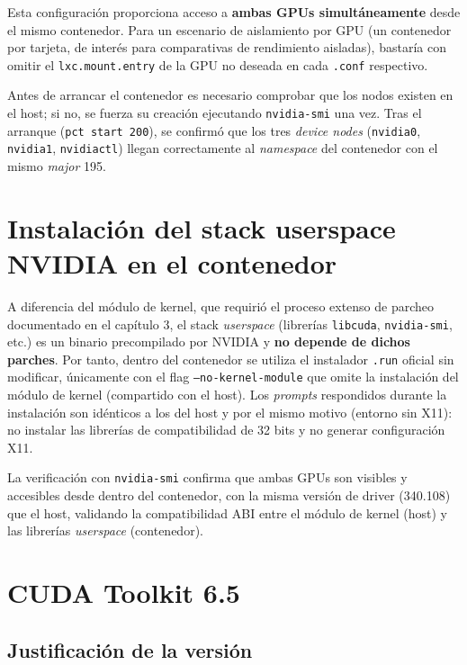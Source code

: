 Esta configuración proporciona acceso a \textbf{ambas GPUs simultáneamente} desde el mismo contenedor. Para un escenario de aislamiento por GPU (un contenedor por tarjeta, de interés para comparativas de rendimiento aisladas), bastaría con omitir el \texttt{lxc.mount.entry} de la GPU no deseada en cada \texttt{.conf} respectivo.

Antes de arrancar el contenedor es necesario comprobar que los nodos existen en el host; si no, se fuerza su creación ejecutando \texttt{nvidia-smi} una vez. Tras el arranque (\texttt{pct start 200}), se confirmó que los tres \textit{device nodes} (\texttt{nvidia0}, \texttt{nvidia1}, \texttt{nvidiactl}) llegan correctamente al \textit{namespace} del contenedor con el mismo \textit{major} 195.

\section{Instalación del stack userspace NVIDIA en el contenedor}

A diferencia del módulo de kernel, que requirió el proceso extenso de parcheo documentado en el capítulo 3, el stack \textit{userspace} (librerías \texttt{libcuda}, \texttt{nvidia-smi}, etc.) es un binario precompilado por NVIDIA y \textbf{no depende de dichos parches}. Por tanto, dentro del contenedor se utiliza el instalador \texttt{.run} oficial sin modificar, únicamente con el flag \texttt{--no-kernel-module} que omite la instalación del módulo de kernel (compartido con el host). Los \textit{prompts} respondidos durante la instalación son idénticos a los del host y por el mismo motivo (entorno sin X11): no instalar las librerías de compatibilidad de 32 bits y no generar configuración X11.

La verificación con \texttt{nvidia-smi} confirma que ambas GPUs son visibles y accesibles desde dentro del contenedor, con la misma versión de driver (340.108) que el host, validando la compatibilidad ABI entre el módulo de kernel (host) y las librerías \textit{userspace} (contenedor).

\section{CUDA Toolkit 6.5}

\subsection{Justificación de la versión}

